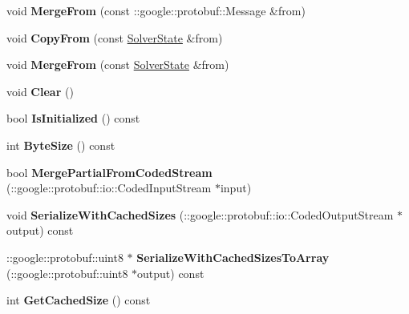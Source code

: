 \begin{DoxyCompactItemize}
void {\bfseries Merge\+From} (const \+::google\+::protobuf\+::\+Message \&from)
\item 
\mbox{\label{classcaffe_1_1_solver_state_ab0a3c45b3ca8c44388b20078ab284199}} 
void {\bfseries Copy\+From} (const \mbox{\hyperlink{classcaffe_1_1_solver_state}{Solver\+State}} \&from)
\item 
\mbox{\label{classcaffe_1_1_solver_state_a32aa6c73d6bbe1a9cc9b7881d124fd81}} 
void {\bfseries Merge\+From} (const \mbox{\hyperlink{classcaffe_1_1_solver_state}{Solver\+State}} \&from)
\item 
\mbox{\label{classcaffe_1_1_solver_state_a51c98b3dfb7885cddcf7d462fe6777d1}} 
void {\bfseries Clear} ()
\item 
\mbox{\label{classcaffe_1_1_solver_state_a98ac82fd8ad73697208f93ea333baa92}} 
bool {\bfseries Is\+Initialized} () const
\item 
\mbox{\label{classcaffe_1_1_solver_state_a6e19b46e9505bf4cbf00846fdc463af8}} 
int {\bfseries Byte\+Size} () const
\item 
\mbox{\label{classcaffe_1_1_solver_state_ad7aa98c26c4d68fddcd677ab727425a3}} 
bool {\bfseries Merge\+Partial\+From\+Coded\+Stream} (\+::google\+::protobuf\+::io\+::\+Coded\+Input\+Stream $\ast$input)
\item 
\mbox{\label{classcaffe_1_1_solver_state_abcb430afb4a461b0bb4c7952871f361b}} 
void {\bfseries Serialize\+With\+Cached\+Sizes} (\+::google\+::protobuf\+::io\+::\+Coded\+Output\+Stream $\ast$output) const
\item 
\mbox{\label{classcaffe_1_1_solver_state_a3f2bd4faf88cfecc54588c3d75de2d0d}} 
\+::google\+::protobuf\+::uint8 $\ast$ {\bfseries Serialize\+With\+Cached\+Sizes\+To\+Array} (\+::google\+::protobuf\+::uint8 $\ast$output) const
\item 
\mbox{\label{classcaffe_1_1_solver_state_a1d45d579d252298364717a903d2bf3b3}} 
int {\bfseries Get\+Cached\+Size} () const

\end{DoxyCompactItemize}
